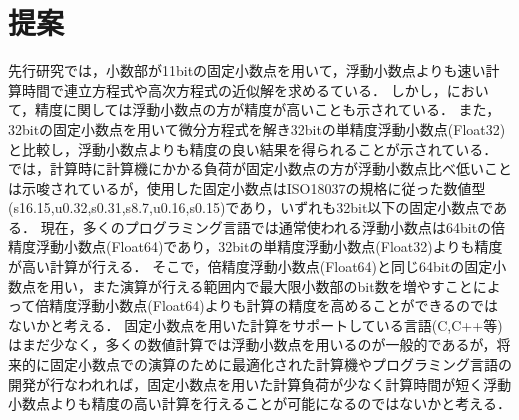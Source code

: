 \section{提案}
先行研究では，小数部が11bitの固定小数点を用いて，浮動小数点よりも速い計算時間で連立方程式や高次方程式の近似解を求めるている\cite{IJERTV12IS010134}．
しかし，\cite{IJERTV12IS010134}において，精度に関しては浮動小数点の方が精度が高いことも示されている．
また，32bitの固定小数点を用いて微分方程式を解き32bitの単精度浮動小数点(Float32)と比較し，浮動小数点よりも精度の良い結果を得られることが示されている\cite{hopkins2020stochastic}．
\cite{hopkins2020stochastic}では，計算時に計算機にかかる負荷が固定小数点の方が浮動小数点比べ低いことは示唆されているが，使用した固定小数点はISO18037の規格に従った数値型(s16.15,u0.32,s0.31,s8.7,u0.16,s0.15)であり，いずれも32bit以下の固定小数点である．
現在，多くのプログラミング言語では通常使われる浮動小数点は64bitの倍精度浮動小数点(Float64)であり，32bitの単精度浮動小数点(Float32)よりも精度が高い計算が行える．
そこで，倍精度浮動小数点(Float64)と同じ64bitの固定小数点を用い，また演算が行える範囲内で最大限小数部のbit数を増やすことによって倍精度浮動小数点(Float64)よりも計算の精度を高めることができるのではないかと考える．
固定小数点を用いた計算をサポートしている言語(C,C++等)はまだ少なく，多くの数値計算では浮動小数点を用いるのが一般的であるが，将来的に固定小数点での演算のために最適化された計算機やプログラミング言語の開発が行なわれれば，固定小数点を用いた計算負荷が少なく計算時間が短く浮動小数点よりも精度の高い計算を行えることが可能になるのではないかと考える．

